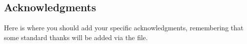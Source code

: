\documentclass[\docopts]{\docclass}
\begin{document}

\subsection*{Acknowledgments}

Here is where you should add your specific acknowledgments, remembering that some standard thanks will be added via the  file.





\end{document}
